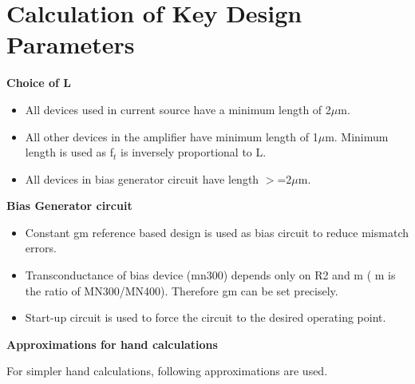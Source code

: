 \documentclass[12pt,a4paper]{article}
\begin{document}
\pagebreak



\section{Calculation of Key Design Parameters}

\textbf{Choice of L}

\begin{itemize}
\item All devices used in current source have a minimum length of 2$\mu$m.
\item All other devices in the amplifier have minimum length of 1$\mu$m. 
Minimum length is used as f$_{t }$ is inversely proportional to L.
\item All devices in bias generator circuit have length $>$=2$\mu$m.
\end{itemize}


\textbf{Bias Generator circuit}

\begin{itemize}
\item Constant gm reference based design is used as bias circuit to 
reduce mismatch errors.
\item Transconductance of bias device (mn300) depends only on R2 and m ( 
m is the ratio of MN300/MN400). Therefore gm can be set precisely.
\item Start-up circuit is used to force the circuit to the desired 
operating point.
\end{itemize}


\textbf{Approximations for hand calculations}

For simpler hand calculations, following approximations are used.
\end{document}
